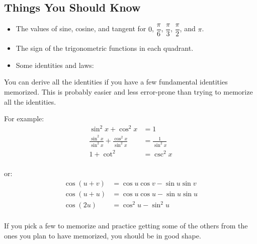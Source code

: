 \documentclass[fleqn,addpoints]{exam}
\begin{document}
\subsection{Things You Should Know}
\begin{itemize}
\item The values of sine, cosine, and tangent for $0$, $\dfrac{\pi}{6}$, $\dfrac{\pi}{3}$, $\dfrac{\pi}{2}$, and $\pi$.
\item The sign of the trigonometric functions in each quadrant.
\item Some identities and laws:
\end{itemize}

You can derive all the identities if you have a few fundamental identities memorized.  This is probably easier
and less error-prone than trying to memorize all the identities.

For example:
\begin{align*}
  \sin^2 x + \cos^2 x &= 1 \\
  \frac{\sin^2 x}{\sin^2 x} + \frac{\cos^2 x}{\sin^2 x} &= \frac{1}{\sin^2 x} \\
  1 + \cot^2 &= \csc^2 x \\
\end{align*}

or:
\begin{align*}
  \cos(u+v) &= \cos u \cos v - \sin u \sin v \\
  \cos(u+u) &= \cos u \cos u - \sin u \sin u \\
  \cos(2u) &= \cos^2 u - \sin^2 u \\
\end{align*}

If you pick a few to memorize and practice getting some of the others from the ones you plan to have memorized, you
should be in good shape.
\end{document}
